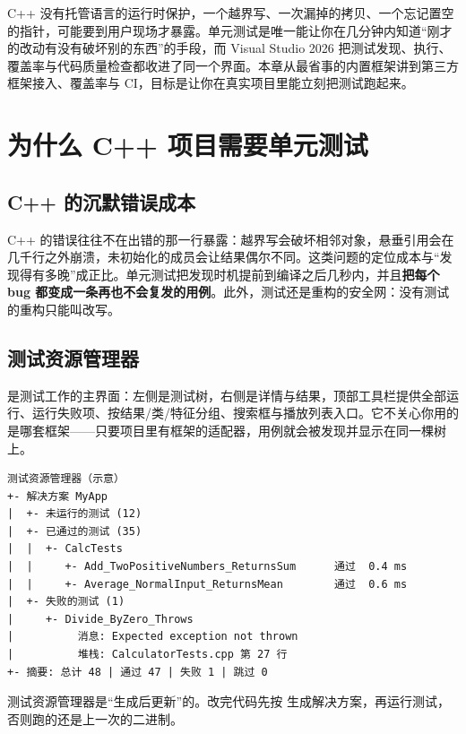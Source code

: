 
C++ 没有托管语言的运行时保护，一个越界写、一次漏掉的拷贝、一个忘记置空的指针，可能要到用户现场才暴露。单元测试是唯一能让你在几分钟内知道“刚才的改动有没有破坏别的东西”的手段，而 Visual Studio 2026 把测试发现、执行、覆盖率与代码质量检查都收进了同一个界面。本章从最省事的内置框架讲到第三方框架接入、覆盖率与 CI，目标是让你在真实项目里能立刻把测试跑起来。

\section{为什么 C++ 项目需要单元测试}

\subsection{C++ 的沉默错误成本}

C++ 的错误往往不在出错的那一行暴露：越界写会破坏相邻对象，悬垂引用会在几千行之外崩溃，未初始化的成员会让结果偶尔不同。这类问题的定位成本与“发现得有多晚”成正比。单元测试把发现时机提前到编译之后几秒内，并且\textbf{把每个 bug 都变成一条再也不会复发的用例}。此外，测试还是重构的安全网：没有测试的重构只能叫改写。

\subsection{测试资源管理器}

 是测试工作的主界面：左侧是测试树，右侧是详情与结果，顶部工具栏提供全部运行、运行失败项、按结果/类/特征分组、搜索框与播放列表入口。它不关心你用的是哪套框架——只要项目里有框架的适配器，用例就会被发现并显示在同一棵树上。

\begin{lstlisting}[style=textstyle]
测试资源管理器（示意）
+- 解决方案 MyApp
|  +- 未运行的测试 (12)
|  +- 已通过的测试 (35)
|  |  +- CalcTests
|  |     +- Add_TwoPositiveNumbers_ReturnsSum      通过  0.4 ms
|  |     +- Average_NormalInput_ReturnsMean        通过  0.6 ms
|  +- 失败的测试 (1)
|     +- Divide_ByZero_Throws
|          消息: Expected exception not thrown
|          堆栈: CalculatorTests.cpp 第 27 行
+- 摘要: 总计 48 | 通过 47 | 失败 1 | 跳过 0
\end{lstlisting}

\begin{tipbox}[提示]
测试资源管理器是“生成后更新”的。改完代码先按  生成解决方案，再运行测试，否则跑的还是上一次的二进制。
\end{tipbox}

